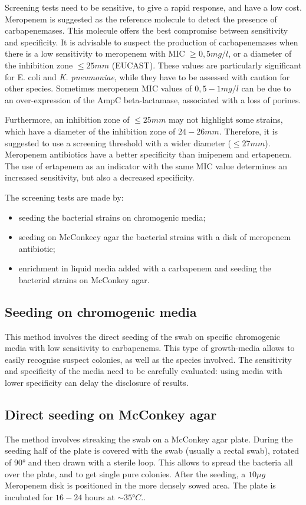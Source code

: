 \documentclass[11pt]{report}
\begin{document}
Screening tests need to be sensitive, to give a rapid response, and have a low cost.
Meropenem is suggested as the reference molecule to detect the presence of carbapenemases. This molecule offers the best compromise between sensitivity and specificity. 
It is advisable to suspect the production of carbapenemases when there is a low sensitivity to meropenem with MIC $\ge 0,5 mg/l$, or a diameter of the inhibition zone $\le 25 mm$ (EUCAST).
These values are particularly significant for E. coli and \emph{K. pneumoniae}, while they have to be assessed with caution for other species. Sometimes meropenem MIC values of $0,5-1 mg/l$ can be due to an over-expression of the AmpC beta-lactamase, associated with a loss of porines.

Furthermore, an inhibition zone of $\le 25 mm$ may not highlight some strains, which have a diameter of the inhibition zone of $24-26 mm$. Therefore, it is suggested to use a screening threshold with a wider diameter ($\le 27 mm$).
Meropenem antibiotics have a better specificity than imipenem and ertapenem.
The use of ertapenem as an indicator with the same MIC value determines an increased sensitivity, but also a decreased specificity.

The screening tests are made by:
\begin{itemize}
\item seeding the bacterial strains on chromogenic media;
\item seeding on McConkecy agar the bacterial strains with a disk of meropenem antibiotic;
\item enrichment in liquid media added with a carbapenem and seeding the bacterial strains on McConkey agar.
\end{itemize}

\subsection{Seeding on chromogenic media}
This method involves the direct seeding of the swab on specific chromogenic media with low sensitivity to carbapenems.
This type of growth-media allows to easily recognise suspect colonies, as well as the species involved.
The sensitivity and specificity of the media need to be carefully evaluated:  using media with lower specificity can delay the disclosure of results.

\subsection{Direct seeding on McConkey agar}
The method involves streaking the swab on a McConkey agar plate.
During the seeding half of the plate is covered  with the swab (usually a rectal swab), rotated of 90° and then drawn with a sterile loop. 
This allows to spread the bacteria all over the plate, and to get single pure colonies.
After the seeding, a $10\mu g$ Meropenem disk is positioned in the more densely sowed area.
The plate is incubated for $16-24$ hours at $\sim 35°C$..
\end{document}
